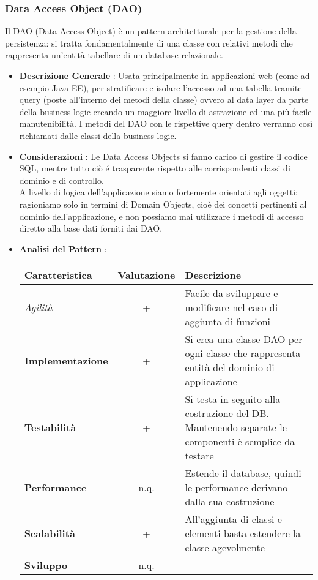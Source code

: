 {{		\subsubsection{Data Access Object (DAO)}{
			Il DAO (Data Access Object) è un pattern architetturale per la gestione della persistenza: si tratta fondamentalmente di una classe con relativi metodi che rappresenta un'entità tabellare di un database relazionale.
			\begin{itemize}\itemsep1pt
				\item \textbf{Descrizione Generale} : Usata principalmente in applicazioni web (come ad esempio Java EE), per stratificare e isolare l'accesso ad una tabella tramite query (poste all'interno dei metodi della classe) ovvero al data layer da parte della business logic creando un maggiore livello di astrazione ed una più facile manutenibilità. I metodi del DAO con le rispettive query dentro verranno così richiamati dalle classi della business logic.
				\item \textbf{Considerazioni} : Le Data Access Objects si fanno carico di gestire il codice SQL, mentre tutto ciò é trasparente rispetto alle corrispondenti classi di dominio e di controllo.\\ 
				A livello di logica dell'applicazione siamo fortemente orientati agli oggetti: ragioniamo solo in termini di Domain Objects, cioè dei concetti pertinenti al dominio dell'applicazione, e non possiamo mai utilizzare i metodi di accesso diretto alla base dati forniti dai DAO. %
				\item \textbf{Analisi del Pattern} :
				\small %
				{\renewcommand\arraystretch{1.2} %
					\begin{tabular}{|l|c|l|}
						\hline
						{\textbf{Caratteristica}}&{\textbf{Valutazione}}&{\textbf{Descrizione}}\\
						\hline
						\textit{Agilità} & + & Facile da sviluppare e modificare nel caso di aggiunta di funzioni \\
						\hline
						\textbf{Implementazione} & + & Si crea una classe DAO per ogni classe che rappresenta entità del dominio di applicazione \\
						\hline
						\textbf{Testabilità} & + & Si testa in seguito alla costruzione del DB. Mantenendo separate le componenti è semplice da testare \\
						\hline
						\textbf{Performance} & n.q. & Estende il database, quindi le performance derivano dalla sua costruzione \\
						\hline
						\textbf{Scalabilità} & + & All'aggiunta di classi e elementi basta estendere la classe agevolmente\\
						\hline
						\textbf{Sviluppo} & n.q. & %
						\hline
					\end{tabular}
				}
			\end{itemize}
		}
	
}}
